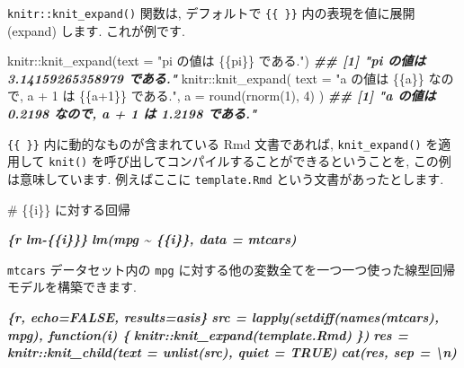 \documentclass[
  11pt,
  lualatex,
  ja=standard]{bxjsreport}
\newenvironment{Shaded}{\begin{snugshade}}{\end{snugshade}}
\newcommand{\AttributeTok}[1]{\textcolor[rgb]{0.77,0.63,0.00}{#1}}
\newcommand{\DecValTok}[1]{\textcolor[rgb]{0.00,0.00,0.81}{#1}}
\newcommand{\DocumentationTok}[1]{\textcolor[rgb]{0.56,0.35,0.01}{\textbf{\textit{#1}}}}
\newcommand{\FunctionTok}[1]{\textcolor[rgb]{0.00,0.00,0.00}{#1}}
\newcommand{\InformationTok}[1]{\textcolor[rgb]{0.56,0.35,0.01}{\textbf{\textit{#1}}}}
\newcommand{\NormalTok}[1]{#1}
\newcommand{\SpecialCharTok}[1]{\textcolor[rgb]{0.00,0.00,0.00}{#1}}
\newcommand{\StringTok}[1]{\textcolor[rgb]{0.31,0.60,0.02}{#1}}
\begin{document}
\texttt{knitr::knit\_expand()} 関数は, デフォルトで \texttt{\{\{ \}\}} 内の表現を値に展開 (expand) します. これが例です.

\begin{Shaded}
\begin{Highlighting}[numbers=left,,]
\NormalTok{knitr}\SpecialCharTok{::}\FunctionTok{knit\_expand}\NormalTok{(}\AttributeTok{text =} \StringTok{"\textasciigrave{}pi\textasciigrave{} の値は \{\{pi\}\} である."}\NormalTok{)}
\DocumentationTok{\#\# [1] "\textasciigrave{}pi\textasciigrave{} の値は 3.14159265358979 である."}
\NormalTok{knitr}\SpecialCharTok{::}\FunctionTok{knit\_expand}\NormalTok{(}
  \AttributeTok{text =} \StringTok{"\textasciigrave{}a\textasciigrave{} の値は \{\{a\}\} なので, \textasciigrave{}a + 1\textasciigrave{} は \{\{a+1\}\} である."}\NormalTok{,}
  \AttributeTok{a =} \FunctionTok{round}\NormalTok{(}\FunctionTok{rnorm}\NormalTok{(}\DecValTok{1}\NormalTok{), }\DecValTok{4}\NormalTok{)}
\NormalTok{)}
\DocumentationTok{\#\# [1] "\textasciigrave{}a\textasciigrave{} の値は 0.2198 なので, \textasciigrave{}a + 1\textasciigrave{} は 1.2198 である."}
\end{Highlighting}
\end{Shaded}

\texttt{\{\{ \}\}} 内に動的なものが含まれている Rmd 文書であれば, \texttt{knit\_expand()} を適用して \texttt{knit()} を呼び出してコンパイルすることができるということを, この例は意味しています. 例えばここに \texttt{template.Rmd} という文書があったとします.

\begin{Shaded}
\begin{Highlighting}[]
\FunctionTok{\# \{\{i\}\} に対する回帰}

\InformationTok{\textasciigrave{}\textasciigrave{}\textasciigrave{}\{r lm{-}\{\{i\}\}\}}
\InformationTok{lm(mpg \textasciitilde{} \{\{i\}\}, data = mtcars)}
\InformationTok{\textasciigrave{}\textasciigrave{}\textasciigrave{}}
\end{Highlighting}
\end{Shaded}

\texttt{mtcars} データセット内の \texttt{mpg} に対する他の変数全てを一つ一つ使った線型回帰モデルを構築できます.

\begin{Shaded}
\begin{Highlighting}[]
\InformationTok{\textasciigrave{}\textasciigrave{}\textasciigrave{}\{r, echo=FALSE, results=\textquotesingle{}asis\textquotesingle{}\}}
\InformationTok{src = lapply(setdiff(names(mtcars), \textquotesingle{}mpg\textquotesingle{}), function(i) \{}
\InformationTok{  knitr::knit\_expand(\textquotesingle{}template.Rmd\textquotesingle{})}
\InformationTok{\})}
\InformationTok{res = knitr::knit\_child(text = unlist(src), quiet = TRUE)}
\InformationTok{cat(res, sep = \textquotesingle{}\textbackslash{}n\textquotesingle{})}
\InformationTok{\textasciigrave{}\textasciigrave{}\textasciigrave{}}
\end{Highlighting}
\end{Shaded}
\end{document}
